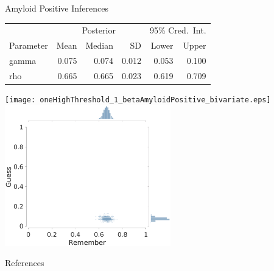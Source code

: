 \documentclass[10pt]{beamer}
\begin{document}
\begin{frame}[fragile]{Amyloid Positive Inferences}

	\begin{table}[h]
		\centering
		\begin{tabular}{lrrrrr}
			\toprule
			\multicolumn{1}{c}{} & \multicolumn{3}{c}{Posterior} & \multicolumn{2}{c}{95\% Cred.\ Int.}                                                               \\
			\cline{2-4}\cline{5-6}
			Parameter            & Mean                          & Median                               & SD    & Lower                    & Upper                    \\
			\cmidrule[0.4pt]{1-6}
			gamma                & 0.075                         & 0.074                                & 0.012 & {\color{darkgreen}0.053} & {\color{darkgreen}0.100} \\
			rho                  & 0.665                         & 0.665                                & 0.023 & {\color{red}      0.619} & {\color{red}      0.709} \\
			\bottomrule
		\end{tabular}
	\end{table}

	\begin{center}
		\texttt{[image: oneHighThreshold\_1\_betaAmyloidPositive\_bivariate.eps]}\pause
		\includegraphics[width = 0.54\textwidth, trim = {0cm 1.8cm 3cm 2.25cm}, clip]{oneHighThreshold_1_betaAmyloidPositive.eps}
	\end{center}
\end{frame}



\begin{frame}[allowframebreaks]{References}


\end{frame}
\end{document}
